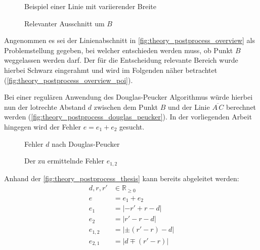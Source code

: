 \mbox{}

\begin{figure}[ht]
    \centering
    
    \caption{Beispiel einer Linie mit variierender Breite}%
    \label{fig:theory_postprocess_overview}
\end{figure}

\wrapfigurefix{0bp}
\begin{figure}
    \centering
    
    \caption{Relevanter Ausschnitt um \(B\)}%
    \label{fig:theory_postprocess_overview_poi}
\end{figure}
Angenommen es sei der Linienabschnitt in \autoref{fig:theory_postprocess_overview} als Problemstellung gegeben, bei welcher entschieden werden muss, ob Punkt \(B\) weggelassen werden darf.
Der für die Entscheidung relevante Bereich wurde hierbei Schwarz eingerahmt und wird im Folgenden näher betrachtet (\autoref{fig:theory_postprocess_overview_poi}).
\wrapfigureunfix{}

Bei einer regulären Anwendung des Douglas-Peucker Algorithmus würde hierbei nun der lotrechte Abstand \(d\) zwischen dem Punkt \(B\) und der Linie \(\overline{A\,C}\) berechnet werden (\autoref{fig:theory_postprocess_douglas_peucker}).
In der vorliegenden Arbeit hingegen wird der Fehler \(e = e_1 + e_2\) gesucht.

\begin{figure}
    \centering
    
    \caption{Fehler \(d\) nach Douglas-Peucker}%
    \label{fig:theory_postprocess_douglas_peucker}
\end{figure}

\begin{figure}
    \centering
    
    \caption{Der zu ermittelnde Fehler \(e_{1,2}\)}%
    \label{fig:theory_postprocess_thesis}
\end{figure}

Anhand der \autoref{fig:theory_postprocess_thesis} kann bereits abgeleitet werden:
\begin{align}
    d, r, r' &\in ℝ_{≥0} \\[3mm]
    e &= e_1 + e_2 \\
    e_1 &= |-r' + r - d| \\
    e_2 &= |r' - r - d| \\
    e_{1,2} &= |\pm(r' - r) - d| \\
    e_{2,1} &= |d \mp (r' - r)|
\end{align}

